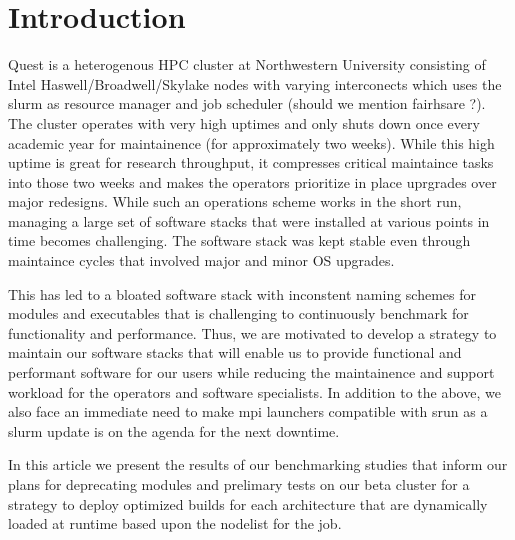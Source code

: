 \documentclass[sigconf,authordraft]{acmart}
\begin{document}


\maketitle

\section{Introduction}

Quest is a heterogenous HPC cluster\cite{quest} at Northwestern University consisting of Intel Haswell/Broadwell/Skylake nodes with varying interconects which uses the slurm\cite{slurm} as resource manager and job scheduler (should we mention fairhsare ?). The cluster operates with very high uptimes and only shuts down once every academic year for maintainence (for approximately two weeks). While this high uptime is great for research throughput, it compresses critical maintaince tasks into those two weeks and makes the operators prioritize in place uprgrades over major redesigns. While such an operations scheme works in the short run, managing a large set of software stacks that were installed at various points in time becomes challenging. The software stack was kept stable even through maintaince cycles that involved major and minor OS upgrades. 

This has led to a bloated software stack with inconstent naming schemes for modules and executables that is challenging to continuously benchmark for functionality and performance. Thus, we are motivated to develop a strategy to maintain our software stacks that will enable us to provide functional and performant software for our users while reducing the maintainence and support workload for the operators and software specialists. In addition to the above, we also face an immediate need to make mpi launchers compatible with srun as a slurm update is on the agenda for the next downtime.

In this article we present the results of our benchmarking studies that inform our plans for deprecating modules and prelimary tests on our beta cluster for a strategy to deploy optimized builds for each architecture that are dynamically loaded at runtime based upon the nodelist for the job.
\end{document}
